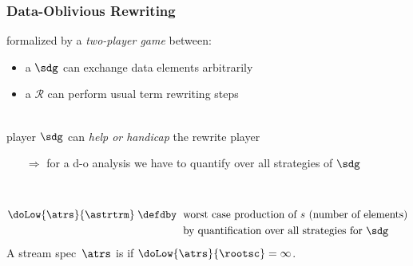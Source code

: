 \documentclass[10pt]{beamer}
\begin{document}
\begin{frame}%
  \frametitle{Data-Oblivious Rewriting}

formalized by a \emph{two-player game} between:
%
\begin{itemize}
  \item a  $\sdg$ can exchange 
        data elements arbitrarily
  \item a  $\mathcal{R}$ 
    can perform usual term rewriting steps
\end{itemize}\ \\[1ex]

player $\sdg$ can \emph{help or handicap} the rewrite player%
%
\begin{itemize}
 \item [$\Rightarrow$] %
   for a d-o analysis we have to quantify over all strategies of $\sdg$
\end{itemize}\ \\[1ex]


\begin{definition}
  \vspace{-2.5ex}
  \begin{align*}
    \doLow{\atrs}{\astrtrm} \;\defdby\;\ &\text{worst case production of $s$ (number of elements)}\\
      &\text{by quantification over all strategies for $\sdg$}
  \end{align*}
  A stream spec~$\atrs$ is  if $\doLow{\atrs}{\rootsc} = \infty$.
\end{definition}

\end{frame}%
\end{document}

